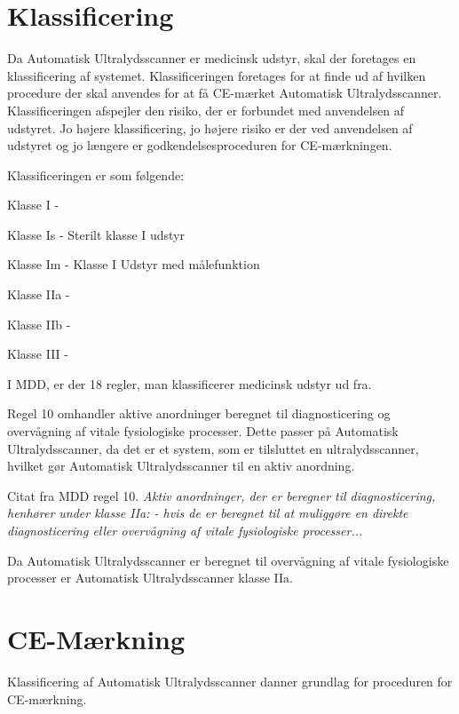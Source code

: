 \section{Klassificering}
Da Automatisk Ultralydsscanner er medicinsk udstyr, skal der foretages en klassificering af systemet. Klassificeringen foretages for at finde ud af hvilken procedure der skal anvendes for at få CE-mærket Automatisk Ultralydsscanner. Klassificeringen afspejler den risiko, der er forbundet med anvendelsen af udstyret. Jo højere klassificering, jo højere risiko er der ved anvendelsen af udstyret og jo længere er godkendelsesproceduren for CE-mærkningen. 

Klassificeringen er som følgende: 

\item Klasse I - 
\item Klasse Is - Sterilt klasse I udstyr
\item Klasse Im - Klasse I Udstyr med målefunktion
\item Klasse IIa - 
\item Klasse IIb - 
\item Klasse III - 



I MDD, er der 18 regler, man klassificerer medicinsk udstyr ud fra. 

Regel 10 omhandler aktive anordninger beregnet til diagnosticering og overvågning af vitale fysiologiske processer. Dette passer på Automatisk Ultralydsscanner, da det er et system, som er tilsluttet en ultralydsscanner, hvilket gør Automatisk Ultralydsscanner til en aktiv anordning.  

Citat fra MDD regel 10. 
\emph{Aktiv anordninger, der er beregner til diagnosticering, henhører under klasse IIa: - hvis de er beregnet til at muliggøre en direkte diagnosticering eller overvågning af vitale fysiologiske processer...}

Da Automatisk Ultralydsscanner er beregnet til overvågning af vitale fysiologiske processer er Automatisk Ultralydsscanner klasse IIa. 

\section{CE-Mærkning}
Klassificering af Automatisk Ultralydsscanner danner grundlag for proceduren for CE-mærkning. 


